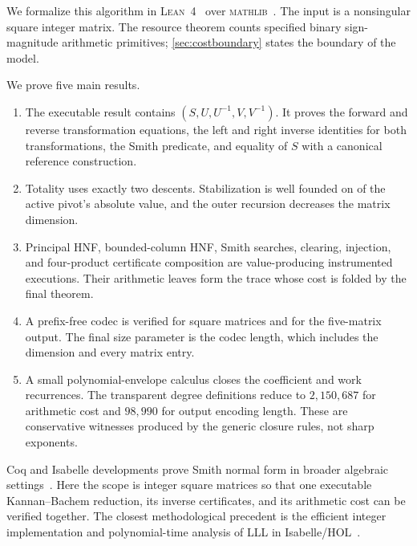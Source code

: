 \documentclass[11pt]{article}
\theoremstyle{definition}
\newcommand{\Lean}{\textsc{Lean}}
\newcommand{\mathlib}{\textsc{mathlib}}
\newcommand{\code}[1]{\texttt{\detokenize{#1}}}
\begin{document}
We formalize this algorithm in \Lean~4~\cite{demoura2021} over \mathlib~\cite{mathlib2020}.  The input is a nonsingular square integer matrix.  The resource theorem counts specified binary sign-magnitude arithmetic primitives; \cref{sec:costboundary} states the boundary of the model.

We prove five main results.

\begin{enumerate}[label=(\arabic*)]
  \item The executable result contains $(S,U,U^{-1},V,V^{-1})$.  It proves the forward and reverse transformation equations, the left and right inverse identities for both transformations, the Smith predicate, and equality of $S$ with a canonical reference construction.

  \item Totality uses exactly two descents.  Stabilization is well founded on \code{Nat.size} of the active pivot's absolute value, and the outer recursion decreases the matrix dimension.

  \item Principal HNF, bounded-column HNF, Smith searches, clearing, injection, and four-product certificate composition are value-producing instrumented executions.  Their arithmetic leaves form the trace whose cost is folded by the final theorem.

  \item A prefix-free codec is verified for square matrices and for the five-matrix output.  The final size parameter is the codec length, which includes the dimension and every matrix entry.

  \item A small polynomial-envelope calculus closes the coefficient and work recurrences.  The transparent degree definitions reduce to $2{,}150{,}687$ for arithmetic cost and $98{,}990$ for output encoding length.  These are conservative witnesses produced by the generic closure rules, not sharp exponents.
\end{enumerate}

Coq and Isabelle developments prove Smith normal form in broader algebraic settings~\cite{cano2016,divason2022}.  Here the scope is integer square matrices so that one executable Kannan--Bachem reduction, its inverse certificates, and its arithmetic cost can be verified together.  The closest methodological precedent is the efficient integer implementation and polynomial-time analysis of LLL in Isabelle/HOL~\cite{bottesch2018}.
\end{document}
